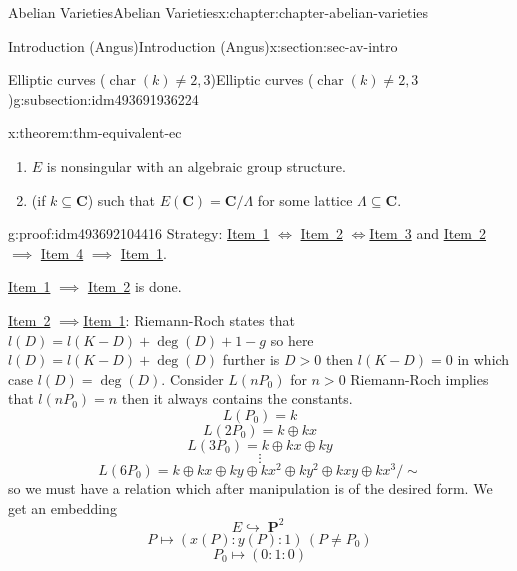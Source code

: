 \documentclass[oneside,10pt,]{book}
\numberwithin{equation}{section}
\newcommand{\CC}{\mathbf{C}}
\DeclareMathOperator{\characteristic}{char}
\DeclareMathOperator{\PP}{\mathbf{P}}
\newcommand{\gt}{>}
\begin{document}
\begin{chapterptx}{Abelian Varieties}{}{Abelian Varieties}{}{}{x:chapter:chapter-abelian-varieties}
\begin{sectionptx}{Introduction (Angus)}{}{Introduction (Angus)}{}{}{x:section:sec-av-intro}
\begin{subsectionptx}{Elliptic curves (\(\characteristic(k) \ne 2,3\))}{}{Elliptic curves (\(\characteristic(k) \ne 2,3\))}{}{}{g:subsection:idm493691936224}
\begin{theorem}{}{}{x:theorem:thm-equivalent-ec}
\begin{enumerate}
\item\hypertarget{x:li:item-nonsing-gp}{}\(E\) is nonsingular with an algebraic group structure.%
\item\hypertarget{x:li:item-cmplx}{}(if \(k \subseteq \CC\)) such that \(E(\CC) = \CC/\Lambda\) for some lattice \(\Lambda \subseteq \CC\).%
\end{enumerate}
%
\end{theorem}
\begin{proofptx}{}{g:proof:idm493692104416}
Strategy: \hyperlink{x:li:item-cubic-eq}{Item~1} \(\iff\) \hyperlink{x:li:item-nonsing-pt}{Item~2} \(\iff\)\hyperlink{x:li:item-nonsing-gp}{Item~3} and \hyperlink{x:li:item-nonsing-pt}{Item~2} \(\implies\) \hyperlink{x:li:item-cmplx}{Item~4} \(\implies\) \hyperlink{x:li:item-cubic-eq}{Item~1}.%
\par
\hyperlink{x:li:item-cubic-eq}{Item~1} \(\implies\) \hyperlink{x:li:item-nonsing-pt}{Item~2} is done.%
\par
\hyperlink{x:li:item-nonsing-pt}{Item~2} \(\implies\)\hyperlink{x:li:item-cubic-eq}{Item~1}: Riemann-Roch states that \(l(D) = l(K-D) +  \deg(D) + 1 -g \) so here \(l(D) = l(K-D) + \deg (D)\) further is \(D\gt 0\) then \(l(K-D) = 0\) in which case \(l(D) = \deg(D)\). Consider \(L(nP_0)\) for \(n \gt 0\) Riemann-Roch implies that \(l(nP_0) = n\) then it always contains the constants.%
\begin{equation*}
L(P_0) = k
\end{equation*}
%
\begin{equation*}
L(2P_0) = k \oplus kx
\end{equation*}
%
\begin{equation*}
L(3P_0) = k \oplus kx \oplus ky
\end{equation*}
%
\begin{equation*}
\vdots
\end{equation*}
%
\begin{equation*}
L(6P_0) = k \oplus kx \oplus ky \oplus k x^2 \oplus ky^2 \oplus kxy \oplus kx^3/\sim
\end{equation*}
so we must have a relation which after manipulation is of the desired form. We get an embedding%
\begin{equation*}
E \hookrightarrow \PP^2
\end{equation*}
%
\begin{equation*}
P\mapsto (x(P):y(P): 1) \,(P\ne P_0)
\end{equation*}
%
\begin{equation*}
P_0 \mapsto (0:1 : 0)
\end{equation*}

\end{proofptx}
\end{subsectionptx}
\end{sectionptx}
\end{chapterptx}
\end{document}
